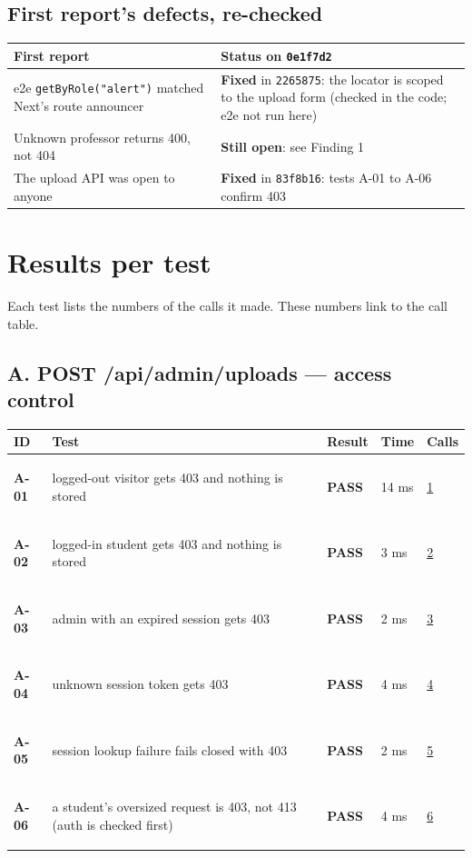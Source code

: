 \documentclass[10pt,a4paper]{article}
\begin{document}
\subsection*{First report's defects, re-checked}
\begin{longtable}{@{}P{7cm}P{9.5cm}@{}}
\toprule \textbf{First report} & \textbf{Status on \texttt{0e1f7d2}} \\ \midrule
e2e \texttt{getByRole("alert")} matched Next's route announcer & \textcolor{passgreen}{\textbf{Fixed}} in \texttt{2265875}: the locator is scoped to the upload form (checked in the code; e2e not run here) \\
Unknown professor returns 400, not 404 & \textcolor{failred}{\textbf{Still open}}: see Finding 1 \\
The upload API was open to anyone & \textcolor{passgreen}{\textbf{Fixed}} in \texttt{83f8b16}: tests A-01 to A-06 confirm 403 \\
\bottomrule
\end{longtable}

\section*{Results per test}
Each test lists the numbers of the calls it made. These numbers link to the call table.

\subsection*{A. POST /api/admin/uploads — access control}
\begin{longtable}{@{}P{1.2cm}P{9.2cm}P{1.2cm}P{1.3cm}P{2.4cm}@{}}
\toprule \textbf{ID} & \textbf{Test} & \textbf{Result} & \textbf{Time} & \textbf{Calls} \\ \midrule \endhead
\hypertarget{test-A-01}{\textbf{A-01}} & logged-out visitor gets 403 and nothing is stored & \textcolor{passgreen}{\textbf{PASS}} & 14 ms & \hyperlink{call1}{1} \\
\hypertarget{test-A-02}{\textbf{A-02}} & logged-in student gets 403 and nothing is stored & \textcolor{passgreen}{\textbf{PASS}} & 3 ms & \hyperlink{call2}{2} \\
\hypertarget{test-A-03}{\textbf{A-03}} & admin with an expired session gets 403 & \textcolor{passgreen}{\textbf{PASS}} & 2 ms & \hyperlink{call3}{3} \\
\hypertarget{test-A-04}{\textbf{A-04}} & unknown session token gets 403 & \textcolor{passgreen}{\textbf{PASS}} & 4 ms & \hyperlink{call4}{4} \\
\hypertarget{test-A-05}{\textbf{A-05}} & session lookup failure fails closed with 403 & \textcolor{passgreen}{\textbf{PASS}} & 2 ms & \hyperlink{call5}{5} \\
\hypertarget{test-A-06}{\textbf{A-06}} & a student's oversized request is 403, not 413 (auth is checked first) & \textcolor{passgreen}{\textbf{PASS}} & 4 ms & \hyperlink{call6}{6} \\
\bottomrule
\end{longtable}
\end{document}
